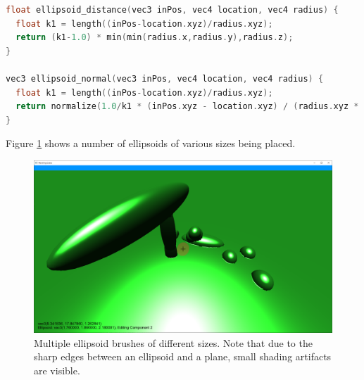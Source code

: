 \documentclass{article}
\begin{document}
\begin{lstlisting}[language=C++,label={ellipsoid_sdf},caption={approximate SDF and normal function for an ellipsoid.}]
float ellipsoid_distance(vec3 inPos, vec4 location, vec4 radius) {
  float k1 = length((inPos-location.xyz)/radius.xyz);
  return (k1-1.0) * min(min(radius.x,radius.y),radius.z);
}

vec3 ellipsoid_normal(vec3 inPos, vec4 location, vec4 radius) {
  float k1 = length((inPos-location.xyz)/radius.xyz);
  return normalize(1.0/k1 * (inPos.xyz - location.xyz) / (radius.xyz * radius.xyz));
}
\end{lstlisting}
Figure \ref{fig:editing_ellipsoids} shows a number of ellipsoids of various sizes being placed.
\begin{figure}[H]
  \includegraphics[width=\textwidth]{editing_ellipsoids}
  \caption{Multiple ellipsoid brushes of different sizes. Note that due to the sharp edges between an ellipsoid and a plane, small shading artifacts are visible.}
  \label{fig:editing_ellipsoids}
\end{figure}
\end{document}
